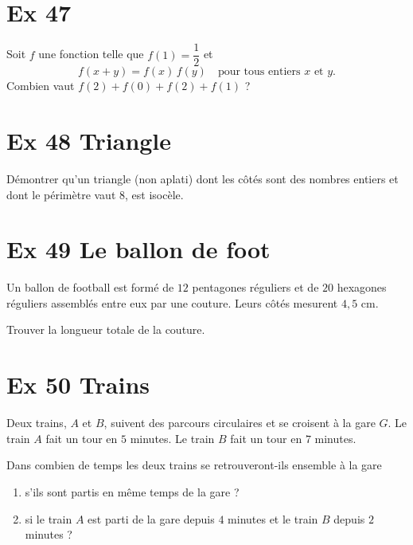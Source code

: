 \documentclass[a4paper,11pt]{article}
\begin{document}
\section*{Ex 47}
Soit \(f\) une fonction telle que \(f(1)=\dfrac12\) et
\[
  f(x+y)=f(x)\,f(y)\quad\text{pour tous entiers }x\text{ et }y.
\]
Combien vaut \(f(2)+f(0)+f(2)+f(1)\) ?

\section*{Ex 48 \quad Triangle}
Démontrer qu’un triangle (non aplati) dont les côtés sont des nombres entiers et dont le périmètre vaut \(8\), est isocèle.

\section*{Ex 49 \quad Le ballon de foot}
Un ballon de football est formé de \(12\) pentagones réguliers et de \(20\) hexagones réguliers assemblés entre eux par une couture.
Leurs côtés mesurent \(4{,}5\) cm.
\medskip

Trouver la longueur totale de la couture.

\section*{Ex 50 \quad Trains}
Deux trains, \(A\) et \(B\), suivent des parcours circulaires et se croisent à la gare \(G\).
Le train \(A\) fait un tour en \(5\) minutes.
Le train \(B\) fait un tour en \(7\) minutes.
\medskip

Dans combien de temps les deux trains se retrouveront-ils ensemble à la gare
\begin{enumerate}
  \item s’ils sont partis en même temps de la gare ?
  \item si le train \(A\) est parti de la gare depuis \(4\) minutes et le train \(B\) depuis \(2\) minutes ?
\end{enumerate}
\end{document}
